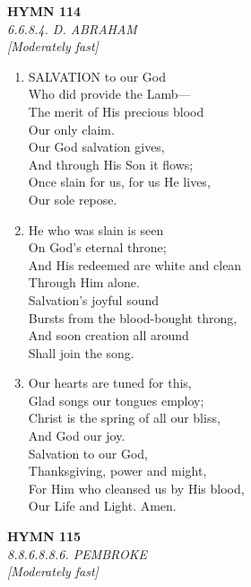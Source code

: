 \newpage
\begin{center}
    {\Large \textbf{HYMN 114}}
    \\
    \textit{6.6.8.4. D. ABRAHAM}
    \\
    \textit{\small [Moderately fast]}
\end{center}
\vspace{1em}

\begin{enumerate}
    \item SALVATION to our God \\
        Who did provide the Lamb--- \\
        The merit of His precious blood \\
        Our only claim. \\
        Our God salvation gives, \\
        And through His Son it flows; \\
        Once slain for us, for us He lives, \\
        Our sole repose.

    \item He who was slain is seen \\
        On God's eternal throne; \\
        And His redeemed are white and clean \\
        Through Him alone. \\
        Salvation's joyful sound \\
        Bursts from the blood-bought throng, \\
        And soon creation all around \\
        Shall join the song.

    \item Our hearts are tuned for this, \\
        Glad songs our tongues employ; \\
        Christ is the spring of all our bliss, \\
        And God our joy. \\
        Salvation to our God, \\
        Thanksgiving, power and might, \\
        For Him who cleansed us by His blood, \\
        Our Life and Light. Amen.

\end{enumerate}

\newpage
\begin{center}
    {\Large \textbf{HYMN 115}}
    \\
    \textit{8.8.6.8.8.6. PEMBROKE}
    \\
    \textit{\small [Moderately fast]}
\end{center}
\vspace{1em}

